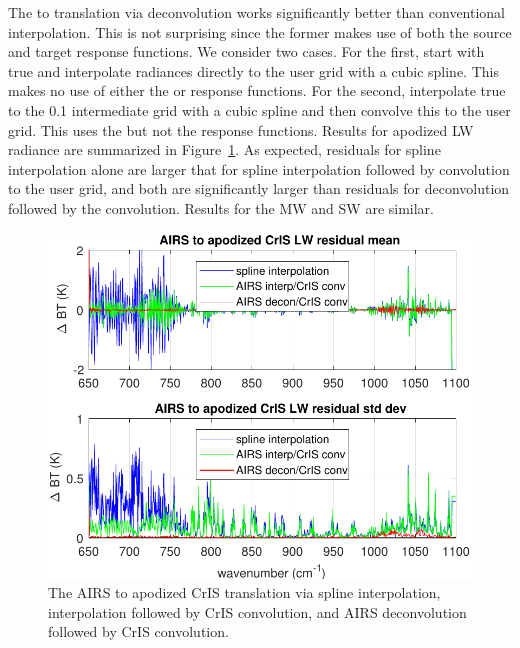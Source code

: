 \documentclass[journal]{IEEEtran}
\begin{document}
The {\airs} to {\cris} translation via deconvolution works
significantly better than conventional interpolation.  This is not
surprising since the former makes use of both the source and target
response functions.  We consider two cases.  For the first, start
with true {\airs} and interpolate radiances directly to the {\cris}
user grid with a cubic spline.  This makes no use of either the
{\airs} or {\cris} response functions.  For the second, interpolate
true {\airs} to the 0.1 {\wn} intermediate grid with a cubic spline
and then convolve this to the {\cris} user grid.  This uses the
{\cris} but not the {\airs} response functions.  Results for
apodized {\cris} LW radiance are summarized in Figure~\ref{intpLW}.
As expected, residuals for spline interpolation alone are larger
that for spline interpolation followed by convolution to the {\cris}
user grid, and both are significantly larger than residuals for
{\airs} deconvolution followed by the {\cris} convolution.  Results
for the MW and SW are similar.

\begin{figure} %
  \centering
  \includegraphics[width=\linewidth]{figures/a2cris_interp_LW.pdf}
  \caption{The AIRS to apodized CrIS translation via spline
    interpolation, interpolation followed by CrIS convolution, and AIRS
    deconvolution followed by CrIS convolution.}
  \label{intpLW}
\end{figure}
\end{document}
